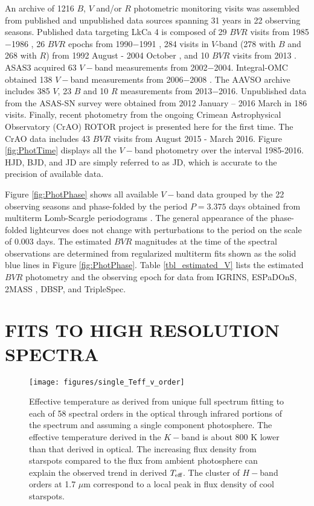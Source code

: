 \documentclass[twocolumn]{emulateapj}%
\newcommand{\name}{LkCa 4 }
\begin{document}
An archive of 1216 $B$, $V$ and/or $R$ photometric monitoring visits was assembled from published and unpublished data sources spanning 31 years in 22 observing seasons.  Published data targeting \name is composed of 29 $BVR$ visits from 1985$-$1986 \citep{vrba93}, 26 $BVR$ epochs from 1990$-$1991 \citep{bouvier93}, 284 visits in $V$-band (278 with $B$ and 268 with $R$) from 1992 August - 2004 October \citep{grankin08}, and 10 $BVR$ visits from 2013 \citep{donati14}.  ASAS3 \citep{pojmanski04} acquired 63 $V-$band measurements from 2002$-$2004.  Integral-OMC obtained 138 $V-$band measurements from 2006$-$2008 \citep{garzon12}.  The AAVSO archive \citep{kafka16} includes 385 $V$, 23 $B$ and 10 $R$ measurements from 2013$-$2016.  Unpublished data from the ASAS-SN survey \citep{shappee14} were obtained from 2012 January -- 2016 March in 186 visits.  Finally, recent photometry from the ongoing Crimean Astrophysical Observatory (CrAO) ROTOR project \citep{grankin08} is presented here for the first time.  The CrAO data includes 43 $BVR$ visits from August 2015 - March 2016. Figure \ref{fig:PhotTime} displays all the $V-$band photometry over the interval 1985-2016.  HJD, BJD, and JD are simply referred to as JD, which is accurate to the precision of available data.


Figure \ref{fig:PhotPhase} shows all available $V-$band data grouped by the 22 observing seasons and phase-folded by the period $P=3.375$ days obtained from multiterm Lomb-Scargle periodograms \citep{ivezic14}.  The general appearance of the phase-folded lightcurves does not change with perturbations to the period on the scale of 0.003 days.  The estimated $BVR$ magnitudes at the time of the spectral observations are determined from regularized multiterm fits \citep[\emph{i.e.} Fourier series truncated to the first $\sim 4$ components]{vanderplas15a} shown as the solid blue lines in Figure \ref{fig:PhotPhase}.  Table \ref{tbl_estimated_V} lists the estimated $BVR$ photometry and the observing epoch for data from IGRINS, ESPaDOnS, 2MASS \citep{skrutskie06}, DBSP, and TripleSpec.  





\section{FITS TO HIGH RESOLUTION SPECTRA}\label{sec:Starfish}

\begin{figure}
 \centering
 \texttt{[image: figures/single\_Teff\_v\_order]}
 \caption{Effective temperature as derived from unique full spectrum fitting to each of 58 spectral orders in the optical through infrared portions of the spectrum and assuming a single component photosphere.  The effective temperature derived in the $K-$band is about 800 K lower than that derived in optical.  The increasing flux density from starspots compared to the flux from ambient photosphere can explain the observed trend in derived $T_\textrm{eff}$.  The cluster of $H-$band orders at 1.7 $\mu$m correspond to a local peak in flux density of cool starspots.}
 \label{fig:SingleTeffvsOrder}
\end{figure}
\end{document}
